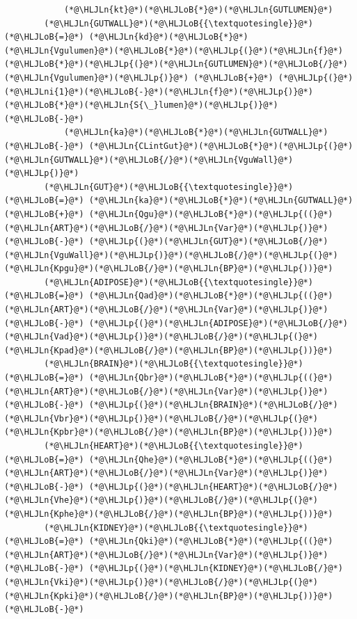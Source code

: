 \documentclass[12pt,a4paper]{article}
\newcommand{\HLJLn}[1]{#1}
\newcommand{\HLJLni}[1]{\textcolor[RGB]{59,151,46}{#1}}
\newcommand{\HLJLoB}[1]{\textcolor[RGB]{102,102,102}{\textbf{#1}}}
\newcommand{\HLJLp}[1]{#1}
\begin{document}
\begin{lstlisting}
            (*@\HLJLn{kt}@*)(*@\HLJLoB{*}@*)(*@\HLJLn{GUTLUMEN}@*)
        (*@\HLJLn{GUTWALL}@*)(*@\HLJLoB{{\textquotesingle}}@*) (*@\HLJLoB{=}@*) (*@\HLJLn{kd}@*)(*@\HLJLoB{*}@*)(*@\HLJLn{Vgulumen}@*)(*@\HLJLoB{*}@*)(*@\HLJLp{(}@*)(*@\HLJLn{f}@*)(*@\HLJLoB{*}@*)(*@\HLJLp{(}@*)(*@\HLJLn{GUTLUMEN}@*)(*@\HLJLoB{/}@*)(*@\HLJLn{Vgulumen}@*)(*@\HLJLp{)}@*) (*@\HLJLoB{+}@*) (*@\HLJLp{(}@*)(*@\HLJLni{1}@*)(*@\HLJLoB{-}@*)(*@\HLJLn{f}@*)(*@\HLJLp{)}@*)(*@\HLJLoB{*}@*)(*@\HLJLn{S{\_}lumen}@*)(*@\HLJLp{)}@*) (*@\HLJLoB{-}@*)
            (*@\HLJLn{ka}@*)(*@\HLJLoB{*}@*)(*@\HLJLn{GUTWALL}@*) (*@\HLJLoB{-}@*) (*@\HLJLn{CLintGut}@*)(*@\HLJLoB{*}@*)(*@\HLJLp{(}@*)(*@\HLJLn{GUTWALL}@*)(*@\HLJLoB{/}@*)(*@\HLJLn{VguWall}@*)(*@\HLJLp{)}@*)
        (*@\HLJLn{GUT}@*)(*@\HLJLoB{{\textquotesingle}}@*) (*@\HLJLoB{=}@*) (*@\HLJLn{ka}@*)(*@\HLJLoB{*}@*)(*@\HLJLn{GUTWALL}@*) (*@\HLJLoB{+}@*) (*@\HLJLn{Qgu}@*)(*@\HLJLoB{*}@*)(*@\HLJLp{((}@*)(*@\HLJLn{ART}@*)(*@\HLJLoB{/}@*)(*@\HLJLn{Var}@*)(*@\HLJLp{)}@*) (*@\HLJLoB{-}@*) (*@\HLJLp{(}@*)(*@\HLJLn{GUT}@*)(*@\HLJLoB{/}@*)(*@\HLJLn{VguWall}@*)(*@\HLJLp{)}@*)(*@\HLJLoB{/}@*)(*@\HLJLp{(}@*)(*@\HLJLn{Kpgu}@*)(*@\HLJLoB{/}@*)(*@\HLJLn{BP}@*)(*@\HLJLp{))}@*)
        (*@\HLJLn{ADIPOSE}@*)(*@\HLJLoB{{\textquotesingle}}@*) (*@\HLJLoB{=}@*) (*@\HLJLn{Qad}@*)(*@\HLJLoB{*}@*)(*@\HLJLp{((}@*)(*@\HLJLn{ART}@*)(*@\HLJLoB{/}@*)(*@\HLJLn{Var}@*)(*@\HLJLp{)}@*) (*@\HLJLoB{-}@*) (*@\HLJLp{(}@*)(*@\HLJLn{ADIPOSE}@*)(*@\HLJLoB{/}@*)(*@\HLJLn{Vad}@*)(*@\HLJLp{)}@*)(*@\HLJLoB{/}@*)(*@\HLJLp{(}@*)(*@\HLJLn{Kpad}@*)(*@\HLJLoB{/}@*)(*@\HLJLn{BP}@*)(*@\HLJLp{))}@*)
        (*@\HLJLn{BRAIN}@*)(*@\HLJLoB{{\textquotesingle}}@*) (*@\HLJLoB{=}@*) (*@\HLJLn{Qbr}@*)(*@\HLJLoB{*}@*)(*@\HLJLp{((}@*)(*@\HLJLn{ART}@*)(*@\HLJLoB{/}@*)(*@\HLJLn{Var}@*)(*@\HLJLp{)}@*) (*@\HLJLoB{-}@*) (*@\HLJLp{(}@*)(*@\HLJLn{BRAIN}@*)(*@\HLJLoB{/}@*)(*@\HLJLn{Vbr}@*)(*@\HLJLp{)}@*)(*@\HLJLoB{/}@*)(*@\HLJLp{(}@*)(*@\HLJLn{Kpbr}@*)(*@\HLJLoB{/}@*)(*@\HLJLn{BP}@*)(*@\HLJLp{))}@*)
        (*@\HLJLn{HEART}@*)(*@\HLJLoB{{\textquotesingle}}@*) (*@\HLJLoB{=}@*) (*@\HLJLn{Qhe}@*)(*@\HLJLoB{*}@*)(*@\HLJLp{((}@*)(*@\HLJLn{ART}@*)(*@\HLJLoB{/}@*)(*@\HLJLn{Var}@*)(*@\HLJLp{)}@*) (*@\HLJLoB{-}@*) (*@\HLJLp{(}@*)(*@\HLJLn{HEART}@*)(*@\HLJLoB{/}@*)(*@\HLJLn{Vhe}@*)(*@\HLJLp{)}@*)(*@\HLJLoB{/}@*)(*@\HLJLp{(}@*)(*@\HLJLn{Kphe}@*)(*@\HLJLoB{/}@*)(*@\HLJLn{BP}@*)(*@\HLJLp{))}@*)
        (*@\HLJLn{KIDNEY}@*)(*@\HLJLoB{{\textquotesingle}}@*) (*@\HLJLoB{=}@*) (*@\HLJLn{Qki}@*)(*@\HLJLoB{*}@*)(*@\HLJLp{((}@*)(*@\HLJLn{ART}@*)(*@\HLJLoB{/}@*)(*@\HLJLn{Var}@*)(*@\HLJLp{)}@*) (*@\HLJLoB{-}@*) (*@\HLJLp{(}@*)(*@\HLJLn{KIDNEY}@*)(*@\HLJLoB{/}@*)(*@\HLJLn{Vki}@*)(*@\HLJLp{)}@*)(*@\HLJLoB{/}@*)(*@\HLJLp{(}@*)(*@\HLJLn{Kpki}@*)(*@\HLJLoB{/}@*)(*@\HLJLn{BP}@*)(*@\HLJLp{))}@*) (*@\HLJLoB{-}@*)

\end{lstlisting}
\end{document}
